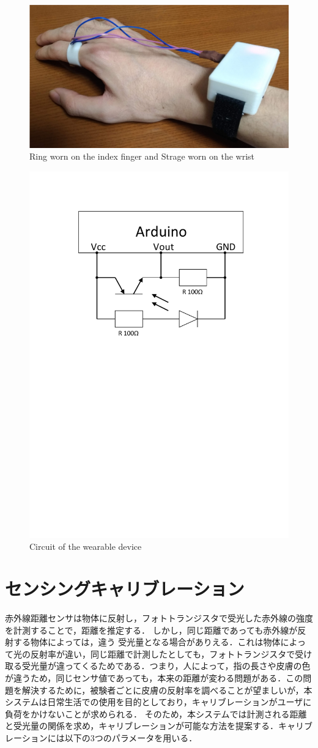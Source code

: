 \begin{figure}[h]
  \centering
  \includegraphics[width=0.8\linewidth]{fig/fal4.png}
  \caption{Ring worn on the index finger and Strage worn on the wrist}
  \label{fig:ring}
\end{figure}



\begin{figure}[H]
  \centering
  \includegraphics[width=0.5\linewidth]{fig/test}
  \caption{Circuit of the wearable device}
  \label{fig:circuit}
\end{figure}



\section{センシングキャリブレーション}
赤外線距離センサは物体に反射し，フォトトランジスタで受光した赤外線の強度を計測することで，距離を推定する．
しかし，同じ距離であっても赤外線が反射する物体によっては，違う
受光量となる場合がありえる．これは物体によって光の反射率が違い，同じ距離で計測したとしても，フォトトランジスタで受け取る受光量が違ってくるためである．つまり，人によって，指の長さや皮膚の色が違うため，同じセンサ値であっても，本来の距離が変わる問題がある．この問題を解決するために，被験者ごとに皮膚の反射率を調べることが望ましいが，本システムは日常生活での使用を目的としており，キャリブレーションがユーザに負荷をかけないことが求められる．
そのため，本システムでは計測される距離と受光量の関係を求め，キャリブレーションが可能な方法を提案する．キャリブレーションには以下の3つのパラメータを用いる．


